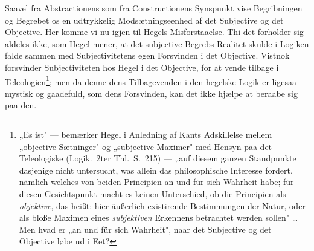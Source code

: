 \documentclass[12pt]{book}
\begin{document}
Saavel fra Abstractionens som fra Constructionens Synspunkt vise Begribningen og Begrebet os en
udtrykkelig Modsætningseenhed af det Subjective og det Objective. Her komme vi nu igjen til
Hegels Misforstaaelse. Thi det forholder sig aldeles ikke, som Hegel mener, at det subjective
Begrebs Realitet skulde i Logiken falde sammen med Subjectivitetens egen Forsvinden i det
Objective. Vistnok forsvinder Subjectiviteten hos Hegel i det Objective, for at vende tilbage i
Teleologien\footnote{„Es ist" --- bemærker Hegel i Anledning af Kants Adskillelse mellem
„objective Sætninger" og „subjective Maximer" med Hensyn paa det Teleologiske (Logik.\ 2ter
Thl.\ S.~215) --- „auf diesem ganzen Standpunkte dasjenige nicht untersucht, was allein das
philosophische Interesse fordert, nämlich welches von beiden Principien an und für sich Wahrheit
habe; für diesen Gesichtspunkt macht es keinen Unterschied, ob die Principien als
\emph{objektive}, das heißt: hier äußerlich existirende Bestimmungen der Natur, oder als bloße
Maximen eines \emph{subjektiven} Erkennens betrachtet werden sollen" \ldots Men hvad er „an und
für sich Wahrheit", naar det Subjective og det Objective løbe ud i Eet?}; men da denne dens
Tilbagevenden i den hegelske Logik er ligesaa mystisk og gaadefuld, som dens Forsvinden, kan det
ikke hjælpe at beraabe sig paa den.
\end{document}
